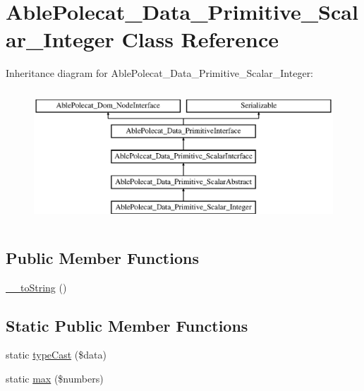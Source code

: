 \hypertarget{class_able_polecat___data___primitive___scalar___integer}{}\section{Able\+Polecat\+\_\+\+Data\+\_\+\+Primitive\+\_\+\+Scalar\+\_\+\+Integer Class Reference}
\label{class_able_polecat___data___primitive___scalar___integer}
Inheritance diagram for Able\+Polecat\+\_\+\+Data\+\_\+\+Primitive\+\_\+\+Scalar\+\_\+\+Integer\+:\begin{figure}[H]
\begin{center}
\leavevmode
\includegraphics[height=5.000000cm]{class_able_polecat___data___primitive___scalar___integer}
\end{center}
\end{figure}
\subsection*{Public Member Functions}
\begin{DoxyCompactItemize}
\item 
\hyperlink{class_able_polecat___data___primitive___scalar___integer_a7516ca30af0db3cdbf9a7739b48ce91d}{\+\_\+\+\_\+to\+String} ()
\end{DoxyCompactItemize}
\subsection*{Static Public Member Functions}
\begin{DoxyCompactItemize}
\item 
static \hyperlink{class_able_polecat___data___primitive___scalar___integer_a68640750b79d1cdda3cddcece68a207e}{type\+Cast} (\$data)
\item 
static \hyperlink{class_able_polecat___data___primitive___scalar___integer_ab0ca104ebb3288467244dbfaeaa474ed}{max} (\$numbers)
\end{DoxyCompactItemize}
